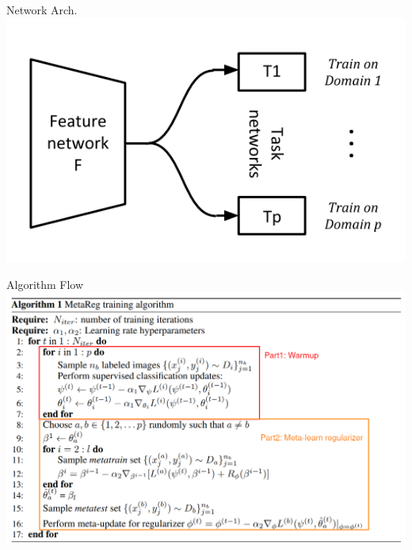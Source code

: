 \documentclass{beamer}
\begin{document}
\begin{frame}{Network Arch.}
  \includegraphics[width=\textwidth]{fig/meta-reg-arch.png}
\end{frame}

\begin{frame}{Algorithm Flow}
  \includegraphics[width=\textwidth]{fig/meta-reg-alg.png}
\end{frame}
\end{document}
